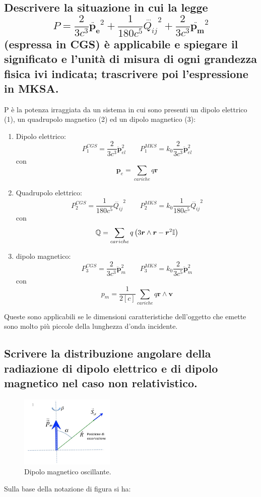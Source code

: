 \subsection[]{ Descrivere la situazione in cui la legge 
\[
	P = \frac{2}{3c^3} \ddot{\boldsymbol{p_{e}}}^2 + \frac{1}{180 c^5} \dddot{Q_{ij}}^2 + \frac{2}{3c^3} \ddot{\boldsymbol{p_m}}^2
\] 
(espressa in CGS) è applicabile e spiegare il significato e l'unità di misura di ogni grandezza fisica ivi indicata; trascrivere poi l'espressione in MKSA.}
P è la potenza irraggiata da un sistema in cui sono presenti un dipolo elettrico (1), un quadrupolo magnetico (2) ed un dipolo magnetico (3):
\begin{enumerate}
	\item Dipolo elettrico:
	\[
		P_{1}^{CGS} = \frac{2}{3 c^3} \ddot{\boldsymbol{p}}_{el}^2 \quad \quad 
		P_{1}^{MKS} = k_{0}\frac{2}{3 c^3} \ddot{\boldsymbol{p}}_{el}^2
	\]
	con
	\[
		\boldsymbol{p}_{e} = \sum_{cariche} q \boldsymbol{r} 
	\] 
	\item Quadrupolo elettrico:
	\[
		P_{2}^{CGS} = \frac{1}{180 c^{5}}\dddot{Q_{ij}}^2 \quad \quad 
		P_{2}^{MKS} = k_{0} \frac{1}{180 c^{5}} \dddot{Q_{ij}}^2
	\]
	con
	\[
		\mathbb{Q} = \sum_{cariche}q\left( 3 \boldsymbol{r} \wedge \boldsymbol{r} - \boldsymbol{r}^2\mathbb{I} \right) 
	\] 
	\item dipolo magnetico:
	\[
		P_{3}^{CGS} = \frac{2}{3c^{3}} \ddot{\boldsymbol{p}}_{m}^2 \quad \quad 
		P_{3}^{MKS} = k_{0} \frac{2}{3c^5} \ddot{\boldsymbol{p} }_{m}^2
	\]
	con
	\[
		p_{m} = \frac{1}{2[c]} \sum_{cariche} q \boldsymbol{r} \wedge \boldsymbol{v}   
	\] 
\end{enumerate}
Queste sono applicabili se le dimensioni caratteristiche dell'oggetto che emette sono molto più piccole della lunghezza d'onda incidente. 


\subsection[]{ Scrivere la distribuzione angolare della radiazione di dipolo elettrico e di dipolo magnetico nel caso non relativistico.}
\begin{figure}[H]
	\centering
	\includegraphics[width=0.4\textwidth]{immagini/2.png}
	\caption{Dipolo magnetico oscillante.}
	\label{fig:2}
\end{figure}
Sulla base della notazione di figura si ha:
